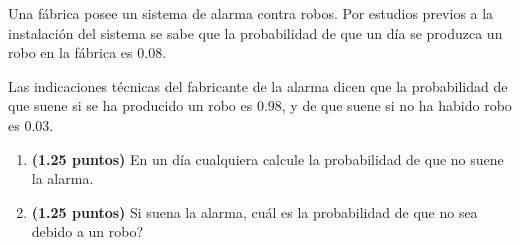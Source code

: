 
Una fábrica posee un sistema de alarma contra robos. Por estudios previos a la instalación del sistema se sabe que la probabilidad de que un día se produzca un robo en la fábrica es $0.08$.

Las indicaciones técnicas del fabricante de la alarma dicen que la probabilidad de que suene si se ha producido un robo es $0.98$, y de que suene si no ha habido robo es $0.03$.
\begin{enumerate}[label=\alph*)]
\item \textbf{(1.25 puntos)} En un día cualquiera calcule la probabilidad de que no suene la alarma.
\item \textbf{(1.25 puntos)} Si suena la alarma, \textquestiondown{}cuál es la probabilidad de que no sea debido a un robo?
\end{enumerate}

